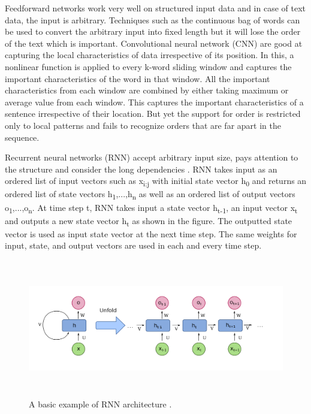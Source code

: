\documentclass[a4paper, 11pt]{article}
\begin{document}
Feedforward networks work very well on structured input data and in case of text data, the input is arbitrary. Techniques such as the continuous bag of words \cite{DBLP:journals/corr/abs-1301-3781} can be used to convert the arbitrary input into fixed length but it will lose the order of the text which is important. Convolutional neural network (CNN) \cite{Bengio1997} are good at capturing the local characteristics of data irrespective of its position. In this, a nonlinear function is applied to every k-word sliding window and captures the important characteristics of the word in that window. All the important characteristics from each window are combined by either taking maximum or average value from each window. This captures the important characteristics of a sentence irrespective of their location. But yet the support for order is restricted only to local patterns and fails to recognize orders that are far apart in the sequence.

Recurrent neural networks (RNN) accept arbitrary input size, pays attention to the structure and consider the long dependencies \cite{Elman}. RNN takes input as an ordered list of input vectors such as x\textsubscript{i:j} with initial state vector h\textsubscript{0} and returns an ordered list of state vectors h\textsubscript{1},...,h\textsubscript{n} as well as an ordered list of output vectors o\textsubscript{1},...,o\textsubscript{n}. At time step t, RNN takes input a state vector h\textsubscript{t-1}, an input vector x\textsubscript{t} and outputs a new state vector h\textsubscript{t} as shown in the figure. The outputted state vector is used as input state vector at the next time step. The same weights for input, state, and output vectors are used in each and every time step.   



\begin{figure}[htpb]
    \centering
    \includegraphics[width=\textwidth,height=6cm,keepaspectratio=true]
    {Recurrent_neural_network_unfold.png}
    \caption{
        A basic example of RNN architecture \cite{WikipediaEN_RNN_unfold}.
    }
    \label{fig:A basic RNN architecture}
\end{figure}
\end{document}
